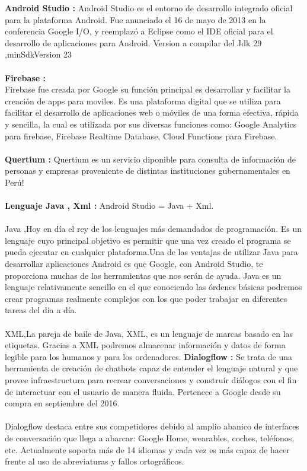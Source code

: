 \documentclass[preprint,12pt]{elsarticle}
\begin{document}
\textbf{Android Studio :}  Android Studio es el entorno de desarrollo integrado oficial para la plataforma Android. Fue anunciado el 16 de mayo de 2013 en la conferencia Google I/O, y reemplazó a Eclipse como el IDE oficial para el desarrollo de aplicaciones para Android.
Version a compilar del Jdk 29 ,minSdkVersion 23
\\\\
\textbf{Firebase :} 
\\
Firebase fue creada por Google su función principal es desarrollar y facilitar la creación de apps para moviles.
Es una plataforma digital que se utiliza para facilitar el desarrollo de aplicaciones web o móviles de una forma efectiva, rápida y sencilla, la cual es utilizada por sus diversas funciones como: Google Analytics para firebase, Firebase Realtime Database, Cloud Functions para Firebase.
\\ \\
\textbf{Quertium :} Quertium es un servicio diponible para
consulta de información de personas y empresas
proveniente de distintas instituciones gubernamentales
en Perú!
\\\\
\textbf{Lenguaje Java , Xml  :} Android Studio = Java + Xml.
\\  \\
Java ,Hoy en día el rey de los lenguajes más demandados de programación. Es un lenguaje cuyo principal objetivo es permitir que una vez creado el programa se pueda ejecutar en cualquier plataforma.Una de las ventajas de utilizar Java para desarrollar aplicaciones Android es que Google, con Android Studio, te proporciona muchas de las herramientas que nos serán de ayuda. Java es un lenguaje relativamente sencillo en el que conociendo las órdenes básicas podremos crear programas realmente complejos con los que poder trabajar en diferentes tareas del día a día.
\\  \\
XML,La pareja de baile de Java, XML, es un lenguaje de marcas basado en las etiquetas. Gracias a XML podremos almacenar información y datos de forma legible para los humanos y para los ordenadores.
\textbf{Dialogflow :} Se trata de una herramienta de creación de chatbots capaz de entender el lenguaje natural y que provee infraestructura para recrear conversaciones y construir diálogos con el fin de interactuar con el usuario de manera fluida. Pertenece a Google desde su compra en septiembre del 2016.
\\  \\
Dialogflow destaca entre sus competidores debido al amplio abanico de interfaces de conversación que llega a abarcar: Google Home, wearables, coches, teléfonos, etc. Actualmente soporta más de 14 idiomas y cada vez es más capaz de hacer frente al uso de abreviaturas y fallos ortográficos.	
	
\end{document}
